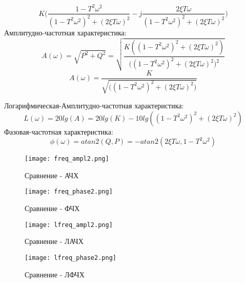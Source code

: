 $$
K\bigg(\frac{ 1 - T^2\omega^2 }{ (1 - T^2\omega^2)^2 + (2\xi T\omega)^2 } - j\frac{2\xi T\omega}{ (1 - T^2\omega^2)^2 + (2\xi T\omega)^2 }\bigg)
$$
Амплитудно-частотная характеристика:
$$
A(\omega) = \sqrt{P^2 + Q^2} = \sqrt{ \frac{ K((1 - T^2\omega^2)^2 + (2\xi T\omega)^2) }{ \bigg((1 - T^2\omega^2)^2 + (2\xi T\omega)^2\bigg)^2 }  }
$$
$$
A(\omega) = \frac{ K }{ \sqrt{ \bigg((1 - T^2\omega^2)^2 + (2\xi T\omega)^2\bigg) }  }
$$

Логарифмическая-Амплитудно-частотная характеристика:
$$
L(\omega) = 20lg(A) = 20lg(K) - 10lg( (1 - T^2\omega^2)^2 + (2\xi T\omega)^2 ) 
$$
Фазовая-частотная характеристика:
$$
\phi(\omega) = atan2(Q,P) = -atan2( 2\xi T\omega , 1 - T^2\omega^2)
$$
\newpage
\begin{figure}[ht]
  \centering
  \texttt{[image: freq\_ampl2.png]}
\caption{Сравнение - АЧХ}
\end{figure}

\begin{figure}[ht]
    \centering
    \texttt{[image: freq\_phase2.png]}
  \caption{Сравнение - ФЧХ}
  \end{figure}
\newpage
\begin{figure}[ht]
    \centering
    \texttt{[image: lfreq\_ampl2.png]}
  \caption{Сравнение - ЛАЧХ}
  \end{figure}
  
  \begin{figure}[ht]
      \centering
      \texttt{[image: lfreq\_phase2.png]}
    \caption{Сравнение - ЛФЧХ}
    \end{figure}

\newpage


\endinput